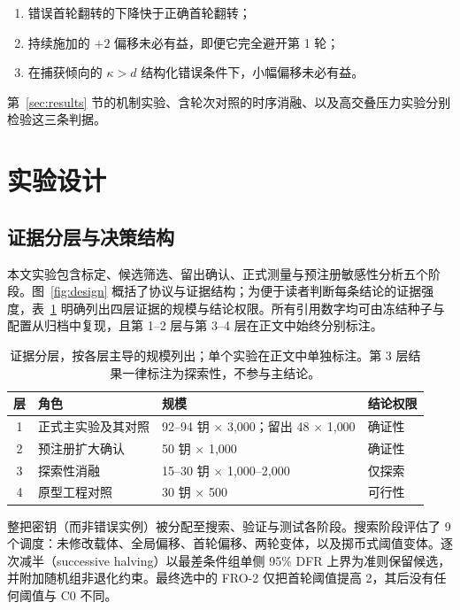 \documentclass[UTF8,a4paper,10pt,twocolumn]{ctexart}
\begin{document}
\begin{enumerate}[label=(\roman*),leftmargin=1.8em,itemsep=0.12em,topsep=0.25em]
\item 错误首轮翻转的下降快于正确首轮翻转；
\item 持续施加的 $+2$ 偏移未必有益，即便它完全避开第 1 轮；
\item 在捕获倾向的 $\kappa>d$ 结构化错误条件下，小幅偏移未必有益。
\end{enumerate}

第~\ref{sec:results} 节的机制实验、含轮次对照的时序消融、以及高交叠压力实验分别检验这三条判据。

\section{实验设计}\label{sec:method}

\subsection{证据分层与决策结构}

本文实验包含标定、候选筛选、留出确认、正式测量与预注册敏感性分析五个阶段。图~\ref{fig:design} 概括了协议与证据结构；为便于读者判断每条结论的证据强度，表~\ref{tab:tiers} 明确列出四层证据的规模与结论权限。所有引用数字均可由冻结种子与配置从归档中复现，且第 1--2 层与第 3--4 层在正文中始终分别标注。

\begin{table}[t]
\centering
\caption{证据分层，按各层主导的规模列出；单个实验在正文中单独标注。第 3 层结果一律标注为探索性，不参与主结论。}
\label{tab:tiers}
\fontsize{6.2}{7.4}\selectfont
\setlength{\tabcolsep}{3pt}
\begin{tabular}{@{}clll@{}}
\toprule
层 & 角色 & 规模 & 结论权限 \\
\midrule
1 & 正式主实验及其对照 & 92--94 钥 $\times$ 3{,}000；留出 48 $\times$ 1{,}000 & 确证性 \\
2 & 预注册扩大确认 & 50 钥 $\times$ 1{,}000 & 确证性 \\
3 & 探索性消融 & 15--30 钥 $\times$ 1{,}000--2{,}000 & 仅探索 \\
4 & 原型工程对照 & 30 钥 $\times$ 500 & 可行性 \\
\bottomrule
\end{tabular}
\end{table}

整把密钥（而非错误实例）被分配至搜索、验证与测试各阶段。搜索阶段评估了 9 个调度：未修改载体、全局偏移、首轮偏移、两轮变体，以及掷币式阈值变体。逐次减半（successive halving）以最差条件组单侧 95\% DFR 上界为准则保留候选，并附加随机组非退化约束。最终选中的 FRO-2 仅把首轮阈值提高 2，其后没有任何阈值与 C0 不同。
\end{document}

